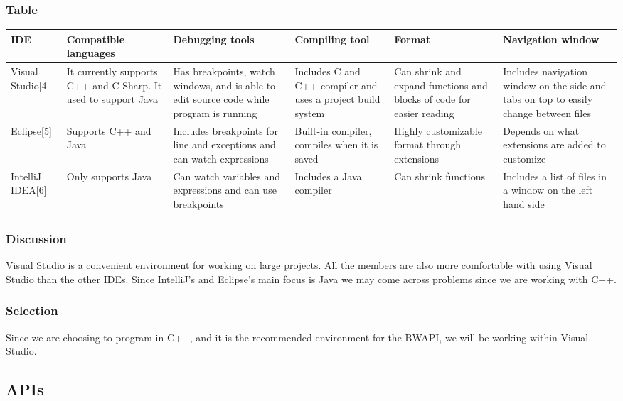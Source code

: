 \documentclass[10pt,letterpaper,onecolumn,draftclsnofoot]{IEEEtran}
\begin{document}
\subsubsection{Table}
\begin{center}
\begin{tabular}{ ||B|M|M|M|M|M|| } 
\hline
IDE & Compatible languages & Debugging tools & Compiling tool & Format & Navigation window\\
 \hline
 Visual Studio[4] & It currently supports C++ and C Sharp. It used to support Java & Has breakpoints, watch windows, and is able to edit source code while program is running & Includes C and C++ compiler and uses a project build system & Can shrink and expand functions and blocks of code for easier reading & Includes navigation window on the side and tabs on top to easily change between files\\ 
 \hline
 Eclipse[5] & Supports C++ and Java & Includes breakpoints for line and exceptions and can watch expressions & Built-in compiler, compiles when it is saved & Highly customizable format through extensions & Depends on what extensions are added to customize\\ 
 \hline
 IntelliJ IDEA[6] & Only supports Java & Can watch variables and expressions and can use breakpoints & Includes a Java compiler & Can shrink functions & Includes a list of files in a window on the left hand side\\ 
 \hline
\end{tabular}
\end{center}


\subsubsection{Discussion}
Visual Studio is a convenient environment for working on large projects. All the members are also more comfortable with using Visual Studio than the other IDEs. Since IntelliJ's and Eclipse's main focus is Java we may come across problems since we are working with C++.

\subsubsection{Selection}
Since we are choosing to program in C++, and it is the recommended environment for the BWAPI, we will be working within Visual Studio.

\subsection{APIs}
\end{document}

